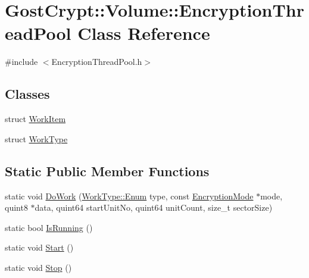 \hypertarget{class_gost_crypt_1_1_volume_1_1_encryption_thread_pool}{}\section{Gost\+Crypt\+:\+:Volume\+:\+:Encryption\+Thread\+Pool Class Reference}
\label{class_gost_crypt_1_1_volume_1_1_encryption_thread_pool}


{\ttfamily \#include $<$Encryption\+Thread\+Pool.\+h$>$}

\subsection*{Classes}
\begin{DoxyCompactItemize}
\item 
struct \hyperlink{struct_gost_crypt_1_1_volume_1_1_encryption_thread_pool_1_1_work_item}{Work\+Item}
\item 
struct \hyperlink{struct_gost_crypt_1_1_volume_1_1_encryption_thread_pool_1_1_work_type}{Work\+Type}
\end{DoxyCompactItemize}
\subsection*{Static Public Member Functions}
\begin{DoxyCompactItemize}
\item 
static void \hyperlink{class_gost_crypt_1_1_volume_1_1_encryption_thread_pool_ac16f2fbe2af1469672eae91f2cfcd814}{Do\+Work} (\hyperlink{struct_gost_crypt_1_1_volume_1_1_encryption_thread_pool_1_1_work_type_ae8c867a2b992c79f01dcc50bab7a448e}{Work\+Type\+::\+Enum} type, const \hyperlink{class_gost_crypt_1_1_volume_1_1_encryption_mode}{Encryption\+Mode} $\ast$mode, quint8 $\ast$data, quint64 start\+Unit\+No, quint64 unit\+Count, size\+\_\+t sector\+Size)
\item 
static bool \hyperlink{class_gost_crypt_1_1_volume_1_1_encryption_thread_pool_a5295b2054e21724860f86540538d670d}{Is\+Running} ()
\item 
static void \hyperlink{class_gost_crypt_1_1_volume_1_1_encryption_thread_pool_a4999a63b3d84378641a5b5c89c1263dc}{Start} ()
\item 
static void \hyperlink{class_gost_crypt_1_1_volume_1_1_encryption_thread_pool_af6b727b3370fe4afc771041563fbc822}{Stop} ()
\end{DoxyCompactItemize}
